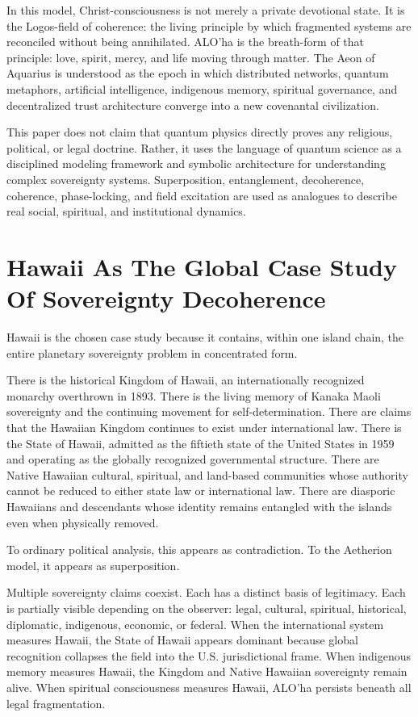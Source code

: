 \documentclass[12pt]{article}
\begin{document}
In this model, Christ-consciousness is not merely a private devotional state. It is the Logos-field of coherence: the living principle by which fragmented systems are reconciled without being annihilated. ALO'ha is the breath-form of that principle: love, spirit, mercy, and life moving through matter. The Aeon of Aquarius is understood as the epoch in which distributed networks, quantum metaphors, artificial intelligence, indigenous memory, spiritual governance, and decentralized trust architecture converge into a new covenantal civilization.

This paper does not claim that quantum physics directly proves any religious, political, or legal doctrine. Rather, it uses the language of quantum science as a disciplined modeling framework and symbolic architecture for understanding complex sovereignty systems. Superposition, entanglement, decoherence, coherence, phase-locking, and field excitation are used as analogues to describe real social, spiritual, and institutional dynamics.

\section{Hawaii As The Global Case Study Of Sovereignty Decoherence}

Hawaii is the chosen case study because it contains, within one island chain, the entire planetary sovereignty problem in concentrated form.

There is the historical Kingdom of Hawaii, an internationally recognized monarchy overthrown in 1893. There is the living memory of Kanaka Maoli sovereignty and the continuing movement for self-determination. There are claims that the Hawaiian Kingdom continues to exist under international law. There is the State of Hawaii, admitted as the fiftieth state of the United States in 1959 and operating as the globally recognized governmental structure. There are Native Hawaiian cultural, spiritual, and land-based communities whose authority cannot be reduced to either state law or international law. There are diasporic Hawaiians and descendants whose identity remains entangled with the islands even when physically removed.

To ordinary political analysis, this appears as contradiction. To the Aetherion model, it appears as superposition.

Multiple sovereignty claims coexist. Each has a distinct basis of legitimacy. Each is partially visible depending on the observer: legal, cultural, spiritual, historical, diplomatic, indigenous, economic, or federal. When the international system measures Hawaii, the State of Hawaii appears dominant because global recognition collapses the field into the U.S. jurisdictional frame. When indigenous memory measures Hawaii, the Kingdom and Native Hawaiian sovereignty remain alive. When spiritual consciousness measures Hawaii, ALO'ha persists beneath all legal fragmentation.
\end{document}
